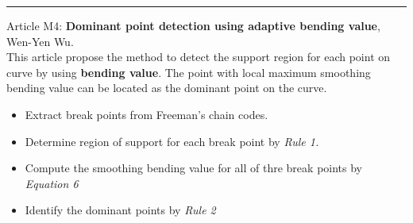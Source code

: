\documentclass[12pt, a4paper]{report}
\begin{document}
\noindent\rule{16cm}{0.4pt}
	Article M4: \textbf{Dominant point detection using adaptive bending value}, Wen-Yen Wu.\\[0.3cm]
	This article propose the method to detect the support region for each point on curve by using \textbf{bending value}. The point with local maximum smoothing bending value can be located as the dominant point on the curve.
	\begin{itemize}
		\item Extract break points from Freeman's chain codes.
		\item Determine region of support for each break point by \textit{Rule 1.}
		\item Compute the smoothing bending value for all of thre break points by \textit{Equation 6}
		\item Identify the dominant points by \textit{Rule 2}
	\end{itemize}
	
	
\end{document}
